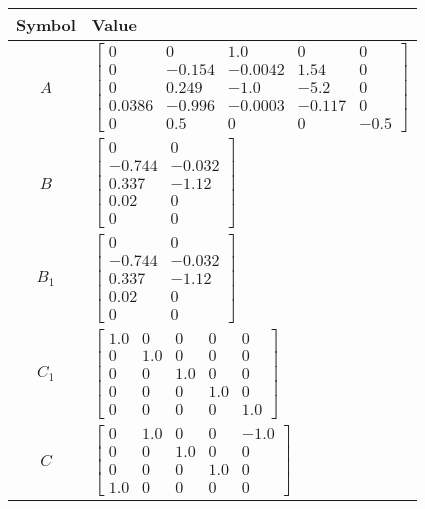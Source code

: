 \begin{tabular}{cl}
\hline
  Symbol  & Value                                                                                                                                                                                      \\
\hline
   $A$    & $\left[\begin{matrix}0 & 0 & 1.0 & 0 & 0\\0 & -0.154 & -0.0042 & 1.54 & 0\\0 & 0.249 & -1.0 & -5.2 & 0\\0.0386 & -0.996 & -0.0003 & -0.117 & 0\\0 & 0.5 & 0 & 0 & -0.5\end{matrix}\right]$ \\
   $B$    & $\left[\begin{matrix}0 & 0\\-0.744 & -0.032\\0.337 & -1.12\\0.02 & 0\\0 & 0\end{matrix}\right]$                                                                                            \\
 $B_{1}$  & $\left[\begin{matrix}0 & 0\\-0.744 & -0.032\\0.337 & -1.12\\0.02 & 0\\0 & 0\end{matrix}\right]$                                                                                            \\
 $C_{1}$  & $\left[\begin{matrix}1.0 & 0 & 0 & 0 & 0\\0 & 1.0 & 0 & 0 & 0\\0 & 0 & 1.0 & 0 & 0\\0 & 0 & 0 & 1.0 & 0\\0 & 0 & 0 & 0 & 1.0\end{matrix}\right]$                                           \\
   $C$    & $\left[\begin{matrix}0 & 1.0 & 0 & 0 & -1.0\\0 & 0 & 1.0 & 0 & 0\\0 & 0 & 0 & 1.0 & 0\\1.0 & 0 & 0 & 0 & 0\end{matrix}\right]$                                                             \\

\end{tabular}

